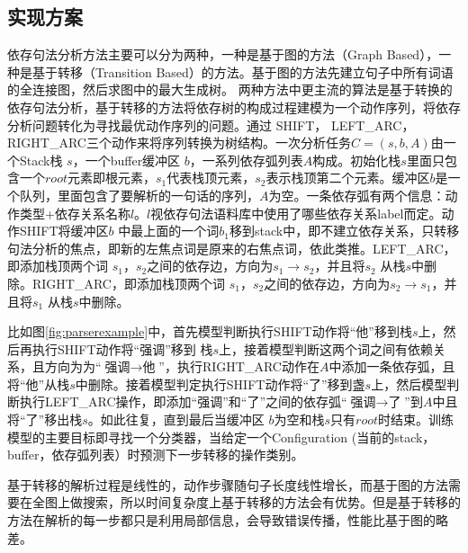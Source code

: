 \subsection{实现方案}
依存句法分析方法主要可以分为两种，一种是基于图的方法（Graph Based），一种是基于转移（Transition Based）的方法。基于图的方法先建立句子中所有词语的全连接图，然后求图中的最大生成树。 两种方法中更主流的算法是基于转换的依存句法分析，基于转移的方法将依存树的构成过程建模为一个动作序列，将依存分析问题转化为寻找最优动作序列的问题。通过 SHIFT， LEFT\_ARC， RIGHT\_ARC三个动作来将序列转换为树结构。一次分析任务$C = (s, b, A)$由一个Stack栈 $s$，一个buffer缓冲区 $b$，一系列依存弧列表$A$构成。初始化栈$s$里面只包含一个$root$元素即根元素，$s_1$代表栈顶元素，$s_2$表示栈顶第二个元素。缓冲区$b$是一个队列，里面包含了要解析的一句话的序列，$A$为空。一条依存弧有两个信息：动作类型+依存关系名称$l$。$l$视依存句法语料库中使用了哪些依存关系label而定。动作SHIFT将缓冲区$b$ 中最上面的一个词$b_1$移到stack中，即不建立依存关系，只转移句法分析的焦点，即新的左焦点词是原来的右焦点词，依此类推。LEFT\_ARC，即添加栈顶两个词 $s_1$，$s_2$之间的依存边，方向为$s_1 \rightarrow s_2$，并且将$s_2$ 从栈$s$中删除。RIGHT\_ARC，即添加栈顶两个词 $s_1$，$s_2$之间的依存边，方向为$s_2 \rightarrow s_1$，并且将$s_1$ 从栈$s$中删除。

比如图\ref{fig:parserexample}中，首先模型判断执行SHIFT动作将“他”移到栈$s$上，然后再执行SHIFT动作将“强调”移到 栈$s$上，接着模型判断这两个词之间有依赖关系，且方向为为“$\text{强调} \rightarrow \text{他}$”，执行RIGHT\_ARC动作在$A$中添加一条依存弧，且将“他”从栈$s$中删除。接着模型判定执行SHIFT动作将“了”移到盏$s$上，然后模型判断执行LEFT\_ARC操作，即添加“强调”和“了”之间的依存弧“$\text{强调} \rightarrow \text{了}$”到$A$中且将“了”移出栈$s$。如此往复，直到最后当缓冲区 $b$为空和栈$s$只有$root$时结束。训练模型的主要目标即寻找一个分类器，当给定一个Configuration (当前的stack，buffer，依存弧列表）时预测下一步转移的操作类别。

基于转移的解析过程是线性的，动作步骤随句子长度线性增长，而基于图的方法需要在全图上做搜索，所以时间复杂度上基于转移的方法会有优势。但是基于转移的方法在解析的每一步都只是利用局部信息，会导致错误传播，性能比基于图的略差。

